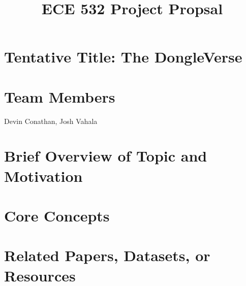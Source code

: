 \documentclass{article}
\title{ECE 532 Project Propsal}
\date{}
\author{}
\begin{document}
\maketitle

\section{Tentative Title: The DongleVerse\textsuperscript{\textregistered}}

\section{Team Members}
Devin Conathan, Josh Vahala

\section{Brief Overview of Topic and Motivation}

\section{Core Concepts}

\section{Related Papers, Datasets, or Resources}
\end{document}
